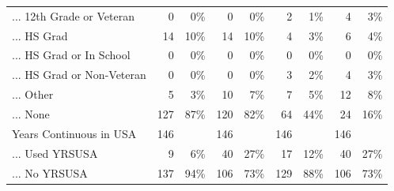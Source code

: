 \documentclass[
  letterpaper,
  DIV=11,
  numbers=noendperiod]{scrartcl}
\begin{document}
\begin{table}[!htbp]
{\begin{tabular}{lrrrrrrrr}
... 12th Grade or Veteran & 0 & 0\% & 0 & 0\% & 2 & 1\% & 4 & 3\% \\ 
... HS Grad & 14 & 10\% & 14 & 10\% & 4 & 3\% & 6 & 4\% \\ 
... HS Grad or In School & 0 & 0\% & 0 & 0\% & 0 & 0\% & 0 & 0\% \\ 
... HS Grad or Non-Veteran & 0 & 0\% & 0 & 0\% & 3 & 2\% & 4 & 3\% \\ 
... Other & 5 & 3\% & 10 & 7\% & 7 & 5\% & 12 & 8\% \\ 
... None & 127 & 87\% & 120 & 82\% & 64 & 44\% & 24 & 16\% \\ 
Years Continuous in USA & 146 &  & 146 &  & 146 &  & 146 &  \\ 
... Used YRSUSA & 9 & 6\% & 40 & 27\% & 17 & 12\% & 40 & 27\% \\ 
... No YRSUSA & 137 & 94\% & 106 & 73\% & 129 & 88\% & 106 & 73\%\\ 
\hline
\hline
\end{tabular}
}
\end{table}
\end{document}
